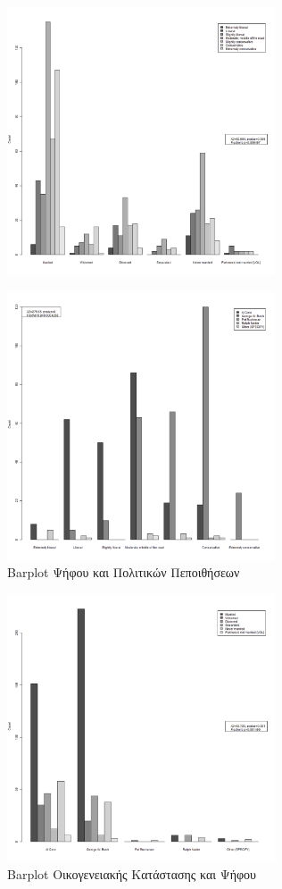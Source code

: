\documentclass[10pt, letterpaper]{article}
\begin{document}
\begin{center}
\begin{figure}[h]
                \includegraphics[width=300px, keepaspectratio]{resources/PoliticalOrientation_MaritalStatus_Plot.png}
            \end{figure}
            \newpage
            \begin{figure}[h]
                \caption{Barplot Ψήφου και Πολιτικών Πεποιθήσεων}
                \label{votepoliticalplot}
                \centering
                \includegraphics[width=300px, keepaspectratio]{resources/Vote_PoliticalOrientation_Plot.png}
            \end{figure}
            \newpage
            \begin{figure}[h]
                \caption{Barplot Οικογενειακής Κατάστασης και Ψήφου}
                \label{maritalvoteplot}
                \centering
                \includegraphics[width=300px, keepaspectratio]{resources/MaritalStatus_Vote_Plot.png}

\end{figure}
\end{center}
\end{document}
